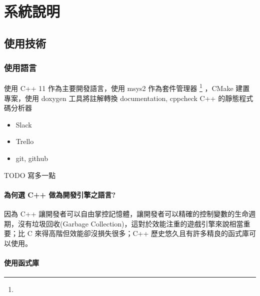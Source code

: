 \chapter{系統說明}

\section{使用技術}

\subsection{使用語言}

使用 C++ 11 作為主要開發語言，使用 msys2 作為套件管理器 \footnote{} ，CMake 建置專案，使用 doxygen 工具將註解轉換 documentation, cppcheck C++ 的靜態程式碼分析器



\begin{itemize}
	\item{Slack}
	\item{Trello}
	\item{git, github}
\end{itemize}

TODO 寫多一點

\subsubsection{為何選 C++ 做為開發引擎之語言?}

因為 C++ 讓開發者可以自由掌控記憶體，讓開發者可以精確的控制變數的生命週期，沒有垃圾回收(Garbage Collection)，這對於效能注重的遊戲引擎來說相當重要；比 C 來得高階但效能卻沒損失很多；C++ 歷史悠久且有許多精良的函式庫可以使用。


\subsubsection{使用函式庫}

